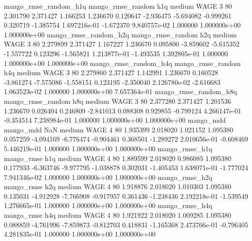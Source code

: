 mango_rmse_random_h1q mango_rmse_random                  h1q     medium     WAGE                 3 80  2.301790       2.371427 1.166253       1.236670    0.120647     -2.936475     -5.694082    -0.999261       0.320719 -1.385754 1.697216e-01    -1.672370   9.840757e-02            1.000000    1.000000e+00        1.000000e+00
mango_rmse_random_h2q mango_rmse_random                  h2q     medium     WAGE                 3 80  2.279899       2.371427 1.167227       1.236670    0.095800     -3.859602     -5.615352    -1.557722       0.123296 -1.565821 1.213877e-01    -1.493535   1.392805e-01            1.000000    1.000000e+00        1.000000e+00
mango_rmse_random_h4q mango_rmse_random                  h4q     medium     WAGE                 3 80  2.279860       2.371427 1.142991       1.236670    0.160528     -3.861274     -7.575086    -1.558151       0.123195 -2.350040 2.126780e-02    -2.616683   1.063523e-02            1.000000    1.000000e+00        7.657364e-01
mango_rmse_random_h8q mango_rmse_random                  h8q     medium     WAGE                 3 80  2.377280       2.371427 1.201536       1.236670    0.026404      0.246809     -2.841013     0.088308       0.929855 -0.799124 4.266147e-01    -0.354514   7.238984e-01            1.000000    1.000000e+00        1.000000e+00
            mango_mdd         mango_mdd                  NaN     medium     WAGE                 4 80  1.935399       2.018020 1.021152       1.095380    0.057259     -4.094169     -6.776474    -0.904461       0.368501 -1.289272 2.010656e-01    -0.608469   5.446219e-01            1.000000    1.000000e+00        1.000000e+00
       mango_rmse_h1q        mango_rmse                  h1q     medium     WAGE                 4 80  1.889599       2.018020 0.986085       1.095380    0.177933     -6.363746     -9.977795    -1.038878       0.302031 -1.405453 1.638071e-01    -1.777024   7.941346e-02            1.000000    1.000000e+00        1.000000e+00
       mango_rmse_h2q        mango_rmse                  h2q     medium     WAGE                 4 80  1.918876       2.018020 1.010303       1.095380    0.135031     -4.912928     -7.766908    -0.917957       0.361436 -1.238436 2.192218e-01    -1.539549   1.276665e-01            1.000000    1.000000e+00        1.000000e+00
       mango_rmse_h4q        mango_rmse                  h4q     medium     WAGE                 4 80  1.921922       2.018020 1.009285       1.095380    0.088859     -4.761996     -7.859873    -0.812703       0.418831 -1.165368 2.473766e-01    -0.796405   4.281835e-01            1.000000    1.000000e+00        1.000000e+00
